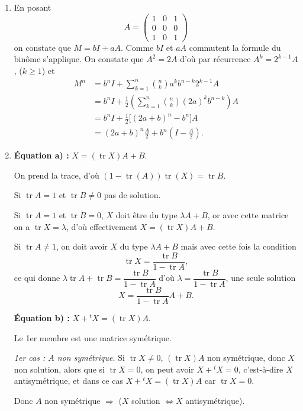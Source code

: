 \begin{enumerate}[label=\arabic*.,leftmargin=2.2em,itemsep=1.2em]
\item En posant
\[
A=\begin{pmatrix}1&0&1\\0&0&0\\1&0&1\end{pmatrix}
\]
on constate que $M=bI+aA$. Comme $bI$ et $aA$ commutent la formule du binôme s'applique. On constate que $A^2=2A$ d'où par récurrence $A^k=2^{k-1}A$, ($k\ge1$) et
\[
\begin{aligned}
M^n&=b^nI+\sum_{k=1}^n\binom nk a^kb^{n-k}2^{k-1}A\\
&=b^nI+\frac12\left(\sum_{k=1}^n\binom nk(2a)^kb^{n-k}\right)A\\
&=b^nI+\frac12\bigl[(2a+b)^n-b^n\bigr]A\\
&=(2a+b)^n\frac A2+b^n\left(I-\frac A2\right).
\end{aligned}
\]

\item \textbf{Équation a) :} $X=(\operatorname{tr}X)A+B$.

On prend la trace, d'où $(1-\operatorname{tr}(A))\operatorname{tr}(X)=\operatorname{tr}B$.

Si $\operatorname{tr}A=1$ et $\operatorname{tr}B\ne0$ pas de solution.

Si $\operatorname{tr}A=1$ et $\operatorname{tr}B=0$, $X$ doit être du type $\lambda A+B$, or avec cette matrice on a $\operatorname{tr}X=\lambda$, d'où effectivement $X=(\operatorname{tr}X)A+B$.

Si $\operatorname{tr}A\ne1$, on doit avoir $X$ du type $\lambda A+B$ mais avec cette fois la condition
\[
\operatorname{tr}X=\frac{\operatorname{tr}B}{1-\operatorname{tr}A},
\]
ce qui donne $\lambda\operatorname{tr}A+\operatorname{tr}B=\dfrac{\operatorname{tr}B}{1-\operatorname{tr}A}$ d'où $\lambda=\dfrac{\operatorname{tr}B}{1-\operatorname{tr}A}$, une seule solution
\[
X=\frac{\operatorname{tr}B}{1-\operatorname{tr}A}A+B.
\]

\textbf{Équation b) :} $X+{}^tX=(\operatorname{tr}X)A$.

Le 1er membre est une matrice symétrique.

\emph{1er cas : $A$ non symétrique.} Si $\operatorname{tr}X\ne0$, $(\operatorname{tr}X)A$ non symétrique, donc $X$ non solution, alors que si $\operatorname{tr}X=0$, on peut avoir $X+{}^tX=0$, c'est-à-dire $X$ antisymétrique, et dans ce cas $X+{}^tX=(\operatorname{tr}X)A$ car $\operatorname{tr}X=0$.

Donc $A$ non symétrique $\Rightarrow$ ($X$ solution $\Longleftrightarrow X$ antisymétrique).


\end{enumerate}
